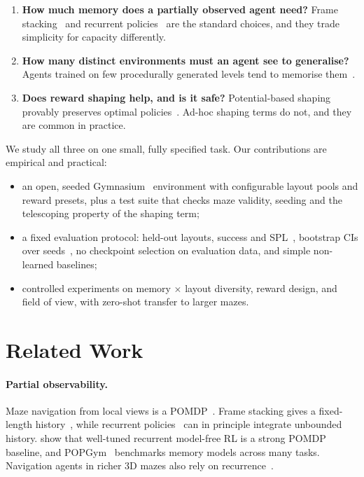 \documentclass[11pt]{article}
\begin{document}
\begin{enumerate}[leftmargin=*,itemsep=2pt]
  \item \textbf{How much memory does a partially observed agent need?} Frame
  stacking~\citep{mnih2015human} and recurrent policies~\citep{hausknecht2015drqn,ni2022recurrent}
  are the standard choices, and they trade simplicity for capacity differently.
  \item \textbf{How many distinct environments must an agent see to
  generalise?} Agents trained on few procedurally generated levels tend to
  memorise them~\citep{zhang2018overfitting,cobbe2019quantifying,cobbe2020procgen,kirk2023survey}.
  \item \textbf{Does reward shaping help, and is it safe?} Potential-based
  shaping provably preserves optimal policies~\citep{ng1999policy}. Ad-hoc
  shaping terms do not, and they are common in practice.
\end{enumerate}

We study all three on one small, fully specified task. Our contributions
are empirical and practical:
\begin{itemize}[leftmargin=*,itemsep=2pt]
  \item an open, seeded Gymnasium~\citep{towers2024gymnasium} environment with
  configurable layout pools and reward presets, plus a test suite that checks
  maze validity, seeding and the telescoping property of the shaping term;
  \item a fixed evaluation protocol: held-out layouts, success and SPL~\citep{anderson2018evaluation},
  bootstrap CIs over seeds~\citep{agarwal2021precipice,henderson2018matters},
  no checkpoint selection on evaluation data, and simple non-learned baselines;
  \item controlled experiments on memory $\times$ layout diversity, reward
  design, and field of view, with zero-shot transfer to larger mazes.
\end{itemize}

\section{Related Work}

\paragraph{Partial observability.} Maze navigation from local views is a
POMDP~\citep{kaelbling1998pomdp}. Frame stacking gives a fixed-length
history~\citep{mnih2015human}, while recurrent policies~\citep{hochreiter1997lstm,hausknecht2015drqn}
can in principle integrate unbounded history.
\citet{ni2022recurrent} show that well-tuned recurrent model-free RL is a
strong POMDP baseline, and POPGym~\citep{morad2023popgym} benchmarks memory
models across many tasks. Navigation agents in richer 3D mazes also rely on
recurrence~\citep{mirowski2017navigate}.
\end{document}
